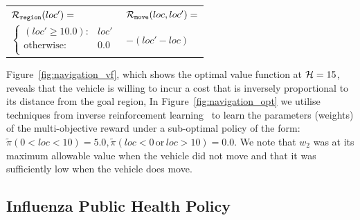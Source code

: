 {\footnotesize 
    \abovedisplayskip=10pt
    \belowdisplayskip=0pt
    \renewcommand{\arraystretch}{1.5}
    \begin{tabular}{ll}    
        $ \mathcal{R}_{\mathtt{region}}(loc') = $ &  $ \mathcal{R}_{\mathtt{move}}(loc, loc') =  $ \\
        \qquad $ \begin{cases}
        (loc' \geq 10.0 ) : & loc' \\
        \text{otherwise} : & 0.0 \\
        \end{cases} $ & \qquad $ - (loc' - loc)  $\\
    \end{tabular}
} 

Figure~\ref{fig:navigation_vf}, which shows the optimal value function at {\footnotesize$ \mathcal{H} = 15 $}, 
reveals that the vehicle is willing to incur a cost that is inversely proportional to its distance from the goal region,
In Figure~\ref{fig:navigation_opt} we utilise techniques from inverse reinforcement learning~\parencite{Ng_ICML_2000} to learn the parameters (weights) of the multi-objective reward under a sub-optimal policy of the form: {\footnotesize $ \tilde{\pi}(0 < loc < 10) = 5.0,  \tilde{\pi}(loc < 0 \,\mathrm{or}\, loc > 10) = 0.0$}. We note that {\footnotesize $ w_2 $} was at its maximum allowable value when the vehicle did not move and that it was sufficiently low when the vehicle does move. 

\subsection{Influenza Public Health Policy}
\label{sec:results_influenza}

